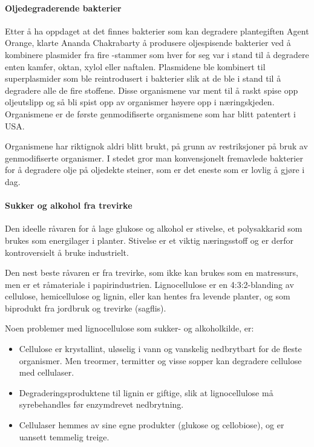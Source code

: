 \paragraph{Oljedegraderende bakterier} Etter å ha oppdaget at det finnes bakterier som kan degradere plantegiften Agent Orange, klarte Ananda Chakrabarty å produsere oljespisende bakterier ved å kombinere plasmider fra fire -stammer som hver for seg var i stand til å degradere enten kamfer, oktan, xylol eller naftalen. Plasmidene ble kombinert til superplasmider som ble reintrodusert i bakterier slik at de ble i stand til å degradere alle de fire stoffene. Disse organismene var ment til å raskt spise opp oljeutslipp og så bli spist opp av organismer høyere opp i næringskjeden. Organismene er de første genmodifiserte organismene som har blitt patentert i USA.

Organismene har riktignok aldri blitt brukt, på grunn av restriksjoner på bruk av genmodifiserte organismer. I stedet gror man konvensjonelt fremavlede bakterier for å degradere olje på oljedekte steiner, som er det eneste som er lovlig å gjøre i dag.

\paragraph{Sukker og alkohol fra trevirke} Den ideelle råvaren for å lage glukose og alkohol er stivelse, et polysakkarid som brukes som energilager i planter. Stivelse er et viktig næringsstoff og er derfor kontroversielt å bruke industrielt.

Den nest beste råvaren er  fra trevirke, som ikke kan brukes som en matressurs, men er et råmateriale i papirindustrien. Lignocellulose er en 4:3:2-blanding av cellulose, hemicellulose og lignin, eller kan hentes fra levende planter, og som biprodukt fra jordbruk og trevirke (sagflis).

Noen problemer med lignocellulose som sukker- og alkoholkilde, er:
\begin{itemize}[nolistsep,noitemsep]
	\item Cellulose er krystallint, uløselig i vann og vanskelig nedbrytbart for de fleste organismer. Men treormer, termitter og visse sopper kan degradere cellulose med cellulaser.
	\item Degraderingsproduktene til lignin er giftige, slik at lignocellulose må syrebehandles før enzymdrevet nedbrytning.
	\item Cellulaser hemmes av sine egne produkter (glukose og cellobiose), og er uansett temmelig treige.
\end{itemize}

